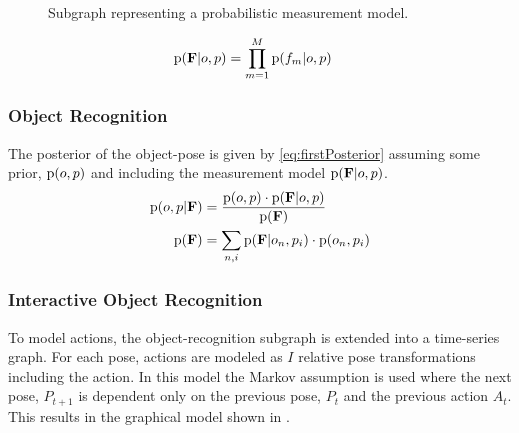 \vspace{-1ex}
            \begin{figure}[h]
              \centering
              \caption{Subgraph representing a probabilistic measurement model.}
              \vspace{-2ex}
              \label{fig:objectRecognitionSubgraph}
            \end{figure}


              \vspace{-2ex}
\begin{align}
\label{eq:setFeatureLikelihood}
                \prob{\set{F}|o,p} &= \prod_{m=1}^{M} \prob{f_m|o,p}
\vspace{-2ex}
\end{align}


 
\subsubsection{Object Recognition}            
            The posterior of the object-pose is given by \eqref{eq:firstPosterior} assuming some prior, $\text{p}(o,p)$ and including the measurement model $\text{p}(\mathbf{F}|o,p)$.
            \begin{align}
                \label{eq:firstPosterior}
                \prob{o,p|\set{F}} &= \frac{\prob{o,p} \cdot \prob{\set{F}|o,p}}{\prob{\set{F}}}\\                
                \label{eq:setFeatureEvidence}
                \prob{\set{F}} &= \sum_{n,i} \prob{\set{F}|o_n,p_i}\cdot \prob{o_n,p_i}
                \vspace{-2ex}
            \end{align}

        \subsubsection{Interactive Object Recognition}
            To model actions, the object-recognition subgraph is extended into a time-series graph. For each pose, actions are modeled as $I$ relative pose transformations including the  action. In this model the Markov assumption is used where the next pose, $P_{t+1}$ is dependent only on the previous pose, $P_t$ and the previous action $A_t$. This results in the graphical model shown in .
            
